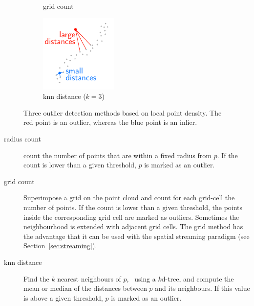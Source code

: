 \begin{figure}[htb]
\begin{subfigure}[b]{0.3\linewidth}
    \caption{grid count}
  \end{subfigure}
  \begin{subfigure}[b]{0.3\linewidth}
    \centering
    \includegraphics[width=\textwidth]{figs/knn-distance.pdf}
    \caption{knn distance ($k=3$)}
  \end{subfigure}
\caption{Three outlier detection methods based on local point density. The red point is an outlier, whereas the blue point is an inlier.}
\label{fig:outlier-detection}
\end{figure}

\begin{description}
  \item[radius count] count the number of points that are within a fixed radius from $p$. If the count is lower than a given threshold, $p$ is marked as an outlier.
  \item[grid count] Superimpose a grid on the point cloud and count for each grid-cell the number of points. If the count is lower than a given threshold, the points inside the corresponding grid cell are marked as outliers. Sometimes the neighbourhood is extended with adjacent grid cells. The grid method has the advantage that it can be used with the spatial streaming paradigm (see Section~\ref{sec:streaming}).
  \item[knn distance] Find the $k$ nearest neighbours of $p$, \eg\ using a $k$d-tree, and compute the mean or median of the distances between $p$ and its neighbours. If this value is above a given threshold, $p$ is marked as an outlier.
\end{description}

